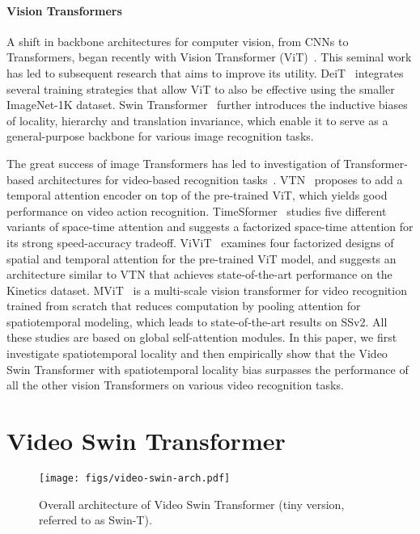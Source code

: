 \documentclass{article}
\begin{document}
\paragraph{Vision Transformers}
A shift in backbone architectures for computer vision, from CNNs to Transformers, began recently with Vision Transformer (ViT)~\cite{dosovitskiy2020vit,touvron2020deit}. This seminal work has led to subsequent research that aims to improve its utility. 
DeiT~\cite{touvron2020deit} integrates several training strategies that allow ViT to also be effective using the smaller ImageNet-1K dataset. 
Swin Transformer~\cite{liu2021swin} further introduces the inductive biases of locality, hierarchy and translation invariance, which enable it to serve as a general-purpose backbone for various image recognition tasks.

The great success of image Transformers has led to investigation of Transformer-based architectures for video-based recognition tasks~\cite{neimark2021VTN,arnab2021vivit, timesformer2021,mvit2021,li2021vidtr}.
VTN~\cite{neimark2021VTN} proposes to add a temporal attention encoder on top of the pre-trained ViT, which yields good performance on video action recognition.
TimeSformer~\cite{timesformer2021} studies five different variants of space-time attention and suggests a factorized space-time attention for its strong speed-accuracy tradeoff.
ViViT~\cite{arnab2021vivit} examines four factorized designs of spatial and temporal attention for the pre-trained ViT model, and suggests an architecture similar to VTN that achieves state-of-the-art performance on the Kinetics dataset.
MViT~\cite{mvit2021} is a multi-scale vision transformer for video recognition trained from scratch that reduces computation by pooling attention for spatiotemporal modeling, which leads to state-of-the-art results on SSv2.
All these studies are based on global self-attention modules. In this paper, we first investigate spatiotemporal locality and then empirically show that the Video Swin Transformer with spatiotemporal locality bias surpasses the performance of all the other vision Transformers on various video recognition tasks.

\section{Video Swin Transformer}

\begin{figure}
    \centering
    \texttt{[image: figs/video-swin-arch.pdf]}
    \caption{Overall architecture of Video Swin Transformer (tiny version, referred to as Swin-T).}
    \label{fig:arch}
\end{figure}
\end{document}
